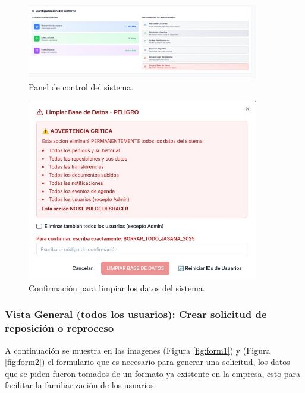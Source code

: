 \documentclass[12pt,letterpaper,spanish]{report}
\begin{document}
\begin{figure}[H]
    \centering
    \includegraphics[width=0.9\textwidth]{admin_panel.jpg}
    \caption{Panel de control del sistema.}
    \label{fig:adminpanel}
\end{figure}
\begin{figure}[H]
    \centering
    \includegraphics[width=0.9\textwidth]{limpi_bd.jpg}
    \caption{Confirmación para limpiar los datos del sistema.}
    \label{fig:borrartodo}
\end{figure}

\subsubsection{Vista General (todos los usuarios): Crear solicitud de reposición o reproceso}
A continuación se muestra en las imagenes (Figura \ref{fig:form1}) y (Figura \ref{fig:form2}) el formulario que es necesario para generar una solicitud, los datos que se piden fueron tomados de un formato ya existente en la empresa, esto para facilitar la familiarización de los usuarios.
\end{document}
